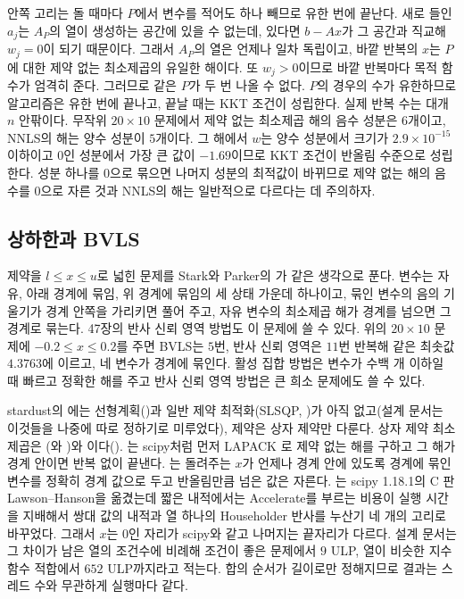 안쪽 고리는 돌 때마다 $P$에서 변수를 적어도 하나 빼므로 유한 번에 끝난다. 새로 들인 $a_j$는 $A_P$의 열이 생성하는 공간에 있을 수 없는데, 있다면 $b-Ax$가 그 공간과 직교해 $w_j=0$이 되기 때문이다. 그래서 $A_P$의 열은 언제나 일차 독립이고, 바깥 반복의 $x$는 $P$에 대한 제약 없는 최소제곱의 유일한 해이다. 또 $w_j>0$이므로 바깥 반복마다 목적 함수가 엄격히 준다\cite{lawson1995}. 그러므로 같은 $P$가 두 번 나올 수 없다. $P$의 경우의 수가 유한하므로 알고리즘은 유한 번에 끝나고, 끝날 때는 KKT 조건이 성립한다. 실제 반복 수는 대개 $n$ 안팎이다. 무작위 $20\times10$ 문제에서 제약 없는 최소제곱 해의 음수 성분은 $6$개이고, NNLS의 해는 양수 성분이 $5$개이다. 그 해에서 $w$는 양수 성분에서 크기가 $2.9\times10^{-15}$ 이하이고 $0$인 성분에서 가장 큰 값이 $-1.69$이므로 KKT 조건이 반올림 수준으로 성립한다. 성분 하나를 $0$으로 묶으면 나머지 성분의 최적값이 바뀌므로 제약 없는 해의 음수를 $0$으로 자른 것과 NNLS의 해는 일반적으로 다르다는 데 주의하자.

\subsection{상하한과 BVLS}

제약을 $l\le x\le u$로 넓힌 문제를 Stark와 Parker의 가 같은 생각으로 푼다\cite{stark1995}. 변수는 자유, 아래 경계에 묶임, 위 경계에 묶임의 세 상태 가운데 하나이고, 묶인 변수의 음의 기울기가 경계 안쪽을 가리키면 풀어 주고, 자유 변수의 최소제곱 해가 경계를 넘으면 그 경계로 묶는다. 47장의 반사 신뢰 영역 방법도 이 문제에 쓸 수 있다. 위의 $20\times10$ 문제에 $-0.2\le x\le0.2$를 주면 BVLS는 $5$번, 반사 신뢰 영역은 $11$번 반복해 같은 최솟값 $4.3763$에 이르고, 네 변수가 경계에 묶인다. 활성 집합 방법은 변수가 수백 개 이하일 때 빠르고 정확한 해를 주고 반사 신뢰 영역 방법은 큰 희소 문제에도 쓸 수 있다.

\begin{instardust}
stardust의 에는 선형계획()과 일반 제약 최적화(SLSQP, )가 아직 없고(설계 문서는 이것들을 나중에 따로 정하기로 미루었다), 제약은 상자 제약만 다룬다. 상자 제약 최소제곱은 (와 )와 이다(). 는 scipy처럼 먼저 LAPACK 로 제약 없는 해를 구하고 그 해가 경계 안이면 반복 없이 끝낸다. 는 돌려주는 $x$가 언제나 경계 안에 있도록 경계에 묶인 변수를 정확히 경계 값으로 두고 반올림만큼 넘은 값은 자른다. 는 scipy 1.18.1의 C 판 Lawson--Hanson을 옮겼는데 짧은 내적에서는 Accelerate를 부르는 비용이 실행 시간을 지배해서 쌍대 값의 내적과 열 하나의 Householder 반사를 누산기 네 개의 고리로 바꾸었다. 그래서 $x$는 $0$인 자리가 scipy와 같고 나머지는 끝자리가 다르다. 설계 문서는 그 차이가 남은 열의 조건수에 비례해 조건이 좋은 문제에서 $9$ ULP, 열이 비슷한 지수 함수 적합에서 $652$ ULP까지라고 적는다. 합의 순서가 길이로만 정해지므로 결과는 스레드 수와 무관하게 실행마다 같다.
\end{instardust}

